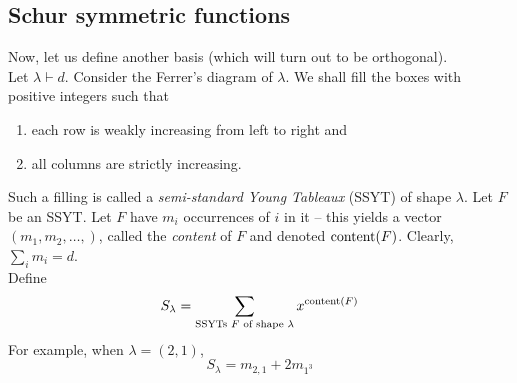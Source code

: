 \subsection{Schur symmetric functions}

	Now, let us define another basis (which will turn out to be orthogonal).\\

	Let $\lambda \vdash d$. Consider the Ferrer's diagram of $\lambda$. We shall fill the boxes with positive integers such that
	\begin{enumerate}
		\item each row is weakly increasing from left to right and
		\item all columns are strictly increasing.
	\end{enumerate}
	Such a filling is called a \emph{semi-standard Young Tableaux} (SSYT) of shape $\lambda$. Let $F$ be an SSYT. Let $F$ have $m_i$ occurrences of $i$ in it -- this yields a vector $(m_1,m_2,\ldots,)$, called the \emph{content} of $F$ and denoted $\operatorname{content}(F)$. Clearly, $\sum_i m_i = d$.\\
	Define
	\[ S_\lambda = \sum_{\text{SSYTs $F$ of shape $\lambda$}} x^{\operatorname{content}(F)} \]
	For example, when $\lambda = (2,1)$,
	\[ S_\lambda = m_{2,1} + 2 m_{1^3} \]

